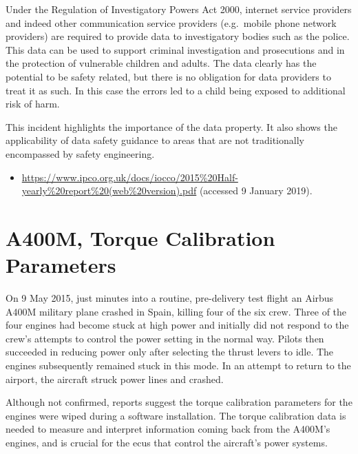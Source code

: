Under the Regulation of Investigatory Powers Act 2000, internet service providers and indeed other communication service providers (e.g.\ mobile phone network providers) are required to provide data to investigatory bodies such as the police. This data can be used to support criminal investigation and prosecutions and in the protection of vulnerable children and adults. The data clearly has the potential to be safety related, but there is no obligation for data providers to treat it as such. In this case the \glspl{error} led to a child being exposed to additional risk of harm.

This incident highlights the importance of the  \gls{data property}. It also shows the applicability of data safety guidance to areas that are not traditionally encompassed by safety engineering.

\begin{samepage}
\begin{itemize}
  \item \raggedright{\href{https://www.ipco.org.uk/docs/iocco/2015\%20Half-yearly\%20report\%20(web\%20version).pdf}{https://www.ipco.org.uk/docs/iocco/2015\%20Half-yearly\%20report\%20(web\%20version).pdf} (accessed 9 January 2019).}
\end{itemize}
\end{samepage}


\section{A400M, Torque Calibration Parameters} \label{bkm:incacc:a400m}
On 9 May 2015, just minutes into a routine, pre-delivery test flight an Airbus A400M military plane crashed in Spain, killing four of the six crew. Three of the four engines had become stuck at high power and initially did not respond to the crew's attempts to control the power setting in the normal way. Pilots then succeeded in reducing power only after selecting the thrust levers to idle. The engines subsequently remained stuck in this mode. In an attempt to return to the airport, the aircraft struck power lines and crashed.  

Although not confirmed, reports suggest the torque calibration parameters for the engines were wiped during a software installation. The torque calibration data is needed to measure and interpret \gls{information} coming back from the A400M's engines, and is crucial for the \glspl{ecu} that control the aircraft's power systems. 

